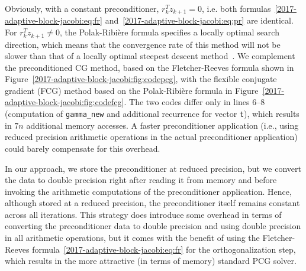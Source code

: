 Obviously, with a constant preconditioner, $r_{k}^T z_{k+1} = 0$, i.e. both
formulas~\eqref{2017-adaptive-block-jacobi:eq:fr} and~\eqref{2017-adaptive-block-jacobi:eq:pr} are identical.
For $r_{k}^T z_{k+1} \neq 0$, the Polak-Ribi\`{e}re formula specifies a locally 
optimal search
direction, which means that the convergence rate of this method will not be 
slower than that of a locally optimal steepest descent
method~\cite{doi:10.1137/060675290}. We complement the preconditioned CG method,
based on the Fletcher-Reeves formula shown in Figure~\ref{2017-adaptive-block-jacobi:fig:codepcg}, with the
flexible conjugate gradient (FCG) method based on the Polak-Ribi\`{e}re formula 
in Figure~\ref{2017-adaptive-block-jacobi:fig:codefcg}. The two codes differ only in lines 6--8 
(computation of {\tt \small gamma\_new} and additional recurrence for vector 
{\tt t}), which results in $7n$ additional memory accesses.  A faster 
preconditioner application 
(i.e., using reduced precision arithmetic operations in the actual 
preconditioner
application) could barely compensate for this overhead.

In our approach, we store the preconditioner at reduced precision, 
but we convert the data to double precision right after reading it from
memory and before invoking the arithmetic computations of the preconditioner
application. Hence, although stored at a reduced precision, the preconditioner
itself remains constant across all iterations. This strategy does
introduce some overhead in terms of converting the preconditioner data to
double precision and using double precision in all arithmetic operations, but it
comes with the benefit of using the Fletcher-Reeves formula~\eqref{2017-adaptive-block-jacobi:eq:fr} for
the orthogonalization step, which results in the more attractive (in terms 
of memory) standard PCG solver.

